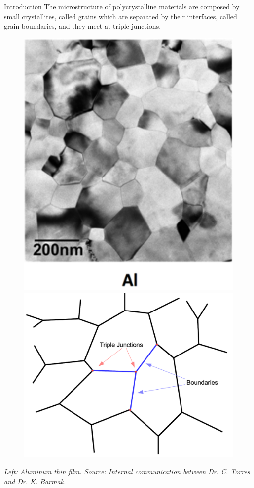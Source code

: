 \documentclass[usenames,dvipsnames]{beamer}
\begin{document}
\begin{frame}{Introduction}
    The microstructure of polycrystalline materials are composed by small crystallites, called grains which are separated by their interfaces, called grain boundaries, and they meet at triple junctions.
    
    \begin{figure}
        \centering
        \includegraphics[scale=0.25, valign=t]{figures/extras/aluminum.png}\hspace{2em}
        \includegraphics[scale=0.27,valign=t]{figures/extras/scheme.pdf}
    \end{figure}
    {\tiny \emph{Left: Aluminum thin film. Source: Internal communication between Dr. C. Torres and Dr. K. Barmak.}}
\end{frame}
\end{document}
